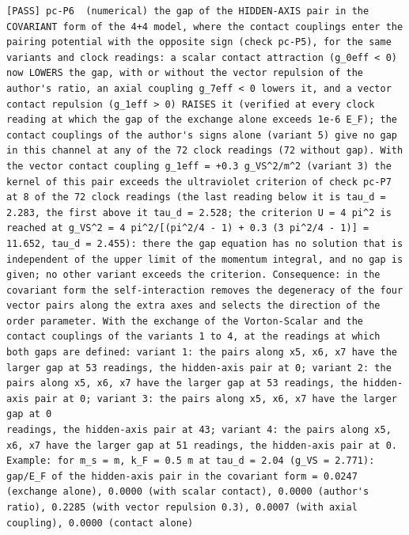 \documentclass[
  10pt,
]{article}
\begin{document}
\begin{verbatim}
[PASS] pc-P6  (numerical) the gap of the HIDDEN-AXIS pair in the COVARIANT form of the 4+4 model, where the contact couplings enter the pairing potential with the opposite sign (check pc-P5), for the same variants and clock readings: a scalar contact attraction (g_0eff < 0) now LOWERS the gap, with or without the vector repulsion of the author's ratio, an axial coupling g_7eff < 0 lowers it, and a vector contact repulsion (g_1eff > 0) RAISES it (verified at every clock reading at which the gap of the exchange alone exceeds 1e-6 E_F); the contact couplings of the author's signs alone (variant 5) give no gap in this channel at any of the 72 clock readings (72 without gap). With the vector contact coupling g_1eff = +0.3 g_VS^2/m^2 (variant 3) the kernel of this pair exceeds the ultraviolet criterion of check pc-P7 at 8 of the 72 clock readings (the last reading below it is tau_d = 2.283, the first above it tau_d = 2.528; the criterion U = 4 pi^2 is reached at g_VS^2 = 4 pi^2/[(pi^2/4 - 1) + 0.3 (3 pi^2/4 - 1)] = 11.652, tau_d = 2.455): there the gap equation has no solution that is independent of the upper limit of the momentum integral, and no gap is given; no other variant exceeds the criterion. Consequence: in the covariant form the self-interaction removes the degeneracy of the four vector pairs along the extra axes and selects the direction of the order parameter. With the exchange of the Vorton-Scalar and the contact couplings of the variants 1 to 4, at the readings at which both gaps are defined: variant 1: the pairs along x5, x6, x7 have the larger gap at 53 readings, the hidden-axis pair at 0; variant 2: the pairs along x5, x6, x7 have the larger gap at 53 readings, the hidden-axis pair at 0; variant 3: the pairs along x5, x6, x7 have the larger gap at 0
readings, the hidden-axis pair at 43; variant 4: the pairs along x5, x6, x7 have the larger gap at 51 readings, the hidden-axis pair at 0. Example: for m_s = m, k_F = 0.5 m at tau_d = 2.04 (g_VS = 2.771): gap/E_F of the hidden-axis pair in the covariant form = 0.0247 (exchange alone), 0.0000 (with scalar contact), 0.0000 (author's ratio), 0.2285 (with vector repulsion 0.3), 0.0007 (with axial coupling), 0.0000 (contact alone)

\end{verbatim}
\end{document}
